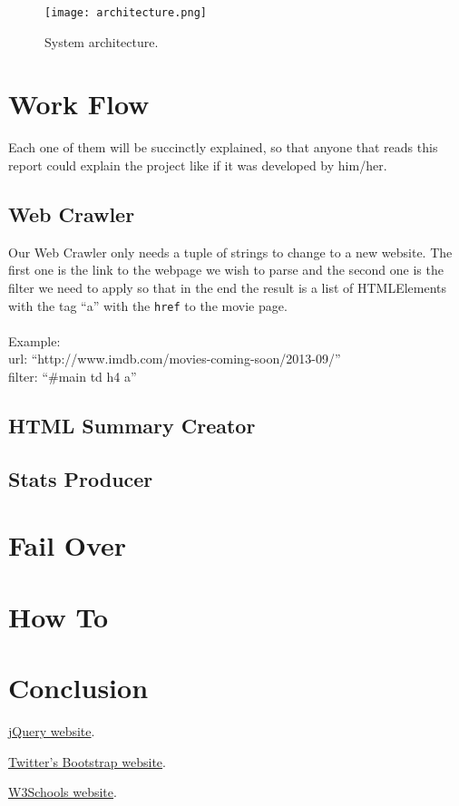 \documentclass[a4paper]{article}
\begin{document}
\begin{figure}[h!]
 	\centering
    \texttt{[image: architecture.png]}
 	\caption{System architecture.}
\end{figure}
\clearpage


\section{Work Flow}
\indent \indent Each one of them will be succinctly explained, so that anyone that reads this report could explain the project like if it was developed by him/her.

\subsection{Web Crawler}
\indent \indent Our Web Crawler only needs a tuple of strings to change to a new website. The first one is the link to the webpage we wish to parse and the second one is the filter we need to apply so that in the end the result is a list of HTMLElements with the tag ``a'' with the \texttt{href} to the movie page.\\
\\Example:\\url: ``http://www.imdb.com/movies-coming-soon/2013-09/''\\filter: ``\#main td h4 a''

\subsection{HTML Summary Creator}
\indent \indent

\subsection{Stats Producer}
\indent \indent

\section{Fail Over}
\indent \indent

\section{How To}
\indent \indent

\section{Conclusion}
\indent \indent 
\clearpage

\begin{thebibliography}{9}
	\href{http://jquery.com/}{jQuery website}.

	\href{http://getbootstrap.com/}{Twitter's Bootstrap website}.

	\href{http://www.w3schools.com/}{W3Schools website}.

\end{thebibliography}
\end{document}

